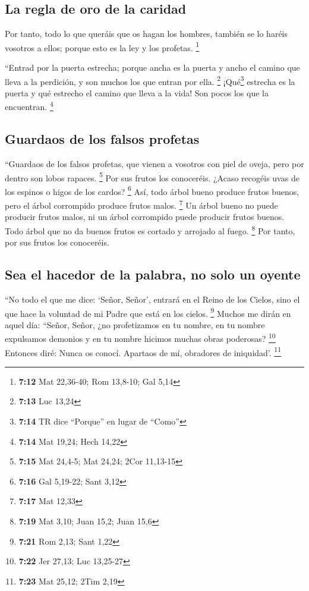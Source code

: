 \begin{paracol}{2}
{\subsection{La regla de oro de la
caridad}\label{la-regla-de-oro-de-la-caridad}}

 Por tanto, todo lo que queráis que os hagan los hombres,
también se lo haréis vosotros a ellos; porque esto es la ley y los
profetas. \footnote{\textbf{7:12} Mat 22,36-40; Rom 13,8-10; Gal 5,14}

 ``Entrad por la puerta estrecha; porque ancha es la
puerta y ancho el camino que lleva a la perdición, y son muchos los que
entran por ella. \footnote{\textbf{7:13} Luc 13,24} 
¡Qué\footnote{\textbf{7:14} TR dice ``Porque'' en lugar de ``Como''}
estrecha es la puerta y qué estrecho el camino que lleva a la vida! Son
pocos los que la encuentran. \footnote{\textbf{7:14} Mat 19,24; Hech
  14,22}

\hypertarget{guardaos-de-los-falsos-profetas}{%
\subsection{Guardaos de los falsos
profetas}\label{guardaos-de-los-falsos-profetas}}

 ``Guardaos de los falsos profetas, que vienen a vosotros
con piel de oveja, pero por dentro son lobos rapaces. \footnote{\textbf{7:15}
  Mat 24,4-5; Mat 24,24; 2Cor 11,13-15}  Por sus frutos
los conoceréis. ¿Acaso recogéis uvas de los espinos o higos de los
cardos? \footnote{\textbf{7:16} Gal 5,19-22; Sant 3,12} 
Así, todo árbol bueno produce frutos buenos, pero el árbol corrompido
produce frutos malos. \footnote{\textbf{7:17} Mat 12,33} 
Un árbol bueno no puede producir frutos malos, ni un árbol corrompido
puede producir frutos buenos.  Todo árbol que no da
buenos frutos es cortado y arrojado al fuego. \footnote{\textbf{7:19}
  Mat 3,10; Juan 15,2; Juan 15,6}  Por tanto, por sus
frutos los conoceréis.

\hypertarget{sea-el-hacedor-de-la-palabra-no-solo-un-oyente}{%
\subsection{Sea el hacedor de la palabra, no solo un
oyente}\label{sea-el-hacedor-de-la-palabra-no-solo-un-oyente}}

 ``No todo el que me dice: `Señor, Señor', entrará en el
Reino de los Cielos, sino el que hace la voluntad de mi Padre que está
en los cielos. \footnote{\textbf{7:21} Rom 2,13; Sant 1,22}
 Muchos me dirán en aquel día: ``Señor, Señor, ¿no
profetizamos en tu nombre, en tu nombre expulsamos demonios y en tu
nombre hicimos muchas obras poderosas? \footnote{\textbf{7:22} Jer
  27,13; Luc 13,25-27}  Entonces diré: Nunca os conocí.
Apartaos de mí, obradores de iniquidad'. \footnote{\textbf{7:23} Mat
  25,12; 2Tim 2,19}


\end{paracol}
